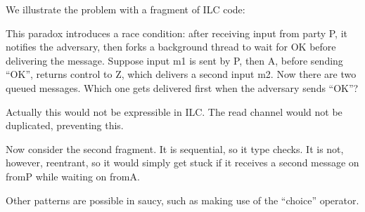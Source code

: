 We illustrate the problem with a fragment of ILC code:


This paradox introduces a race condition: after receiving input from party P, it
notifies the adversary, then forks a background thread to wait for OK before
delivering the message. Suppose input m1 is sent by P, then A, before sending
“OK”, returns control to Z, which delivers a second input m2. Now there are two
queued messages. Which one gets delivered first when the adversary sends “OK”?

Actually this would not be expressible in ILC. The read channel would not be
duplicated, preventing this.



Now consider the second fragment.  It is sequential, so it type checks. It is
not, however, reentrant, so it would simply get stuck if it receives a second
message on fromP while waiting on fromA.

Other patterns are possible in saucy, such as making use of the ``choice''
operator.
